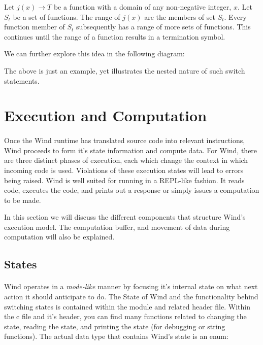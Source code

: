 \begin{theorem}
Let $j(x) \longrightarrow T$ be a function with a domain of any non-negative integer, $x$. Let $S_t$ be a set of functions. The range of $j(x)$ are the members of set $S_t$. Every function member of $S_t$ subsequently has a range of more sets of functions. This continues until the range of a function results in a termination symbol. 
\end{theorem}

We can further explore this idea in the following diagram:


The above is just an example, yet illustrates the nested nature of such switch statements.

\section{Execution and Computation}

\paragraph{  } Once the Wind runtime has translated source code into relevant instructions, Wind proceeds to form it's state information and compute data. For Wind, there are three distinct phases of execution, each which change the context in which incoming code is used. Violations of these execution states will lead to errors being raised. Wind is well suited for running in a REPL-like fashion. It reads code, executes the code, and prints out a response or simply issues a computation to be made.
\par In this section we will discuss the different components that structure Wind's execution model. The computation buffer, and movement of data during computation will also be explained.

\subsection{States}

\paragraph{  } Wind operates in a \emph{mode-like} manner by focusing it's internal state on what next action it should anticipate to do. The State of Wind and the functionality behind switching states is contained within the  module and related header file. Within the c file and it's header, you can find many functions related to changing the state, reading the state, and printing the state (for debugging or string functions). The actual data type that contains Wind's state is an enum:


